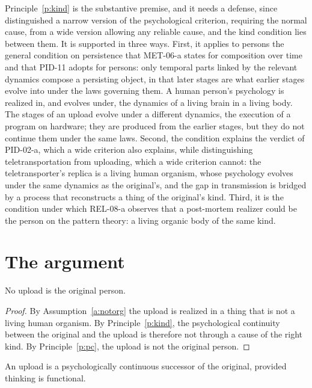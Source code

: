 \documentclass{situationist-preprint}
\begin{document}
Principle~\ref{p:kind} is the substantive premise, and it needs a defense, since \citet{Parfit1984} distinguished a narrow version of the psychological criterion, requiring the normal cause, from a wide version allowing any reliable cause, and the kind condition lies between them. It is supported in three ways. First, it applies to persons the general condition on persistence that MET-06-a states for composition over time and that PID-11 adopts for persons: only temporal parts linked by the relevant dynamics compose a persisting object, in that later stages are what earlier stages evolve into under the laws governing them. A human person's psychology is realized in, and evolves under, the dynamics of a living brain in a living body. The stages of an upload evolve under a different dynamics, the execution of a program on hardware; they are produced from the earlier stages, but they do not continue them under the same laws. Second, the condition explains the verdict of PID-02-a, which a wide criterion also explains, while distinguishing teletransportation from uploading, which a wide criterion cannot: the teletransporter's replica is a living human organism, whose psychology evolves under the same dynamics as the original's, and the gap in transmission is bridged by a process that reconstructs a thing of the original's kind. Third, it is the condition under which REL-08-a observes that a post-mortem realizer could be the person on the pattern theory: a living organic body of the same kind.

\section{The argument}\label{s:arg}

\begin{theorem}\label{t:notperson}
No upload is the original person.
\end{theorem}

\begin{proof}
By Assumption~\ref{a:notorg} the upload is realized in a thing that is not a living human organism. By Principle~\ref{p:kind}, the psychological continuity between the original and the upload is therefore not through a cause of the right kind. By Principle~\ref{p:pc}, the upload is not the original person.
\end{proof}

\begin{theorem}\label{t:succ}
An upload is a psychologically continuous successor of the original, provided thinking is functional.
\end{theorem}
\end{document}
